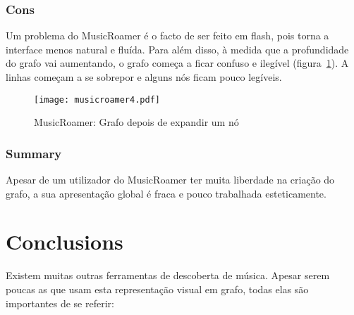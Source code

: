 
  \subsubsection{Cons} %
  \label{ssub:cons}

  Um problema do MusicRoamer é o facto de ser feito em flash, pois torna a interface menos natural e fluída.
  Para além disso, à medida que a profundidade do grafo vai aumentando, o grafo começa a ficar confuso e ilegível (figura~\ref{fig:sota_musicroamer4}).
  A linhas começam a se sobrepor e alguns nós ficam pouco legíveis.

  \begin{figure}[tb]
    \begin{center}
      \texttt{[image: musicroamer4.pdf]}
    \end{center}
    \caption{MusicRoamer: Grafo depois de expandir um nó}
    \label{fig:sota_musicroamer4}
  \end{figure}


  \subsubsection{Summary} %
  \label{ssub:summary}

  Apesar de um utilizador do MusicRoamer ter muita liberdade na criação do grafo, a sua apresentação global é fraca e pouco trabalhada esteticamente.
  





\section{Conclusions}

Existem muitas outras ferramentas de descoberta de música. Apesar serem poucas as que usam esta representação visual em grafo, todas elas são importantes de se referir:

